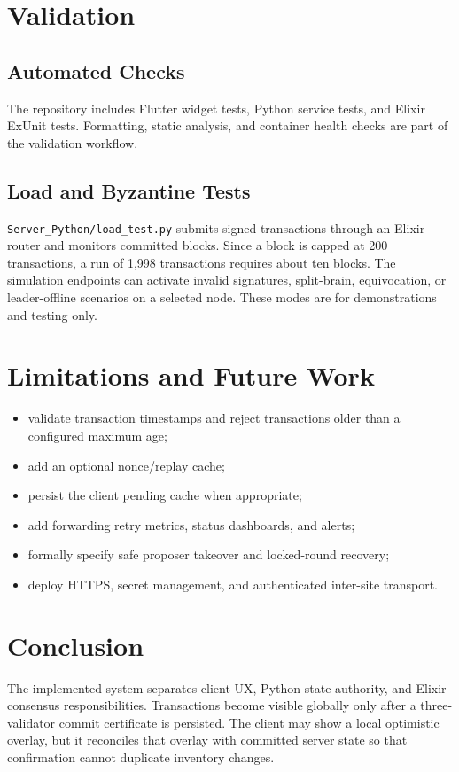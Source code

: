 \documentclass[11pt,a4paper]{memoir}
\begin{document}
\chapter{Validation}

\section{Automated Checks}
The repository includes Flutter widget tests, Python service tests, and
Elixir ExUnit tests. Formatting, static analysis, and container health checks
are part of the validation workflow.

\section{Load and Byzantine Tests}
\texttt{Server\_Python/load\_test.py} submits signed transactions through an
Elixir router and monitors committed blocks. Since a block is capped at 200
transactions, a run of 1,998 transactions requires about ten blocks. The
simulation endpoints can activate invalid signatures, split-brain,
equivocation, or leader-offline scenarios on a selected node. These modes are
for demonstrations and testing only.

\chapter{Limitations and Future Work}
\begin{itemize}
  \item validate transaction timestamps and reject transactions older than a
        configured maximum age;
  \item add an optional nonce/replay cache;
  \item persist the client pending cache when appropriate;
  \item add forwarding retry metrics, status dashboards, and alerts;
  \item formally specify safe proposer takeover and locked-round recovery;
  \item deploy HTTPS, secret management, and authenticated inter-site
        transport.
\end{itemize}

\chapter{Conclusion}
The implemented system separates client UX, Python state authority, and
Elixir consensus responsibilities. Transactions become visible globally only
after a three-validator commit certificate is persisted. The client may show
a local optimistic overlay, but it reconciles that overlay with committed
server state so that confirmation cannot duplicate inventory changes.
\end{document}
